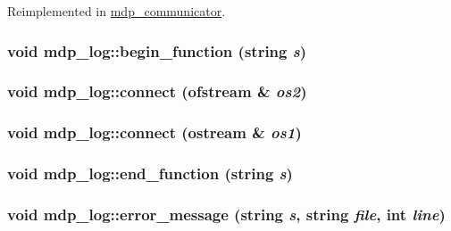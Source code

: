 Reimplemented in \hyperlink{classmdp__communicator_aa601b7788f242a7f71b955a6bdf7e002}{mdp\_\-communicator}.\hypertarget{classmdp__log_a7fac0134af18caa8311bbf3118b82df1}{
\subsubsection[{begin\_\-function}]{\setlength{\rightskip}{0pt plus 5cm}void mdp\_\-log::begin\_\-function (string {\em s})}}
\label{classmdp__log_a7fac0134af18caa8311bbf3118b82df1}
\hypertarget{classmdp__log_a9f9fbc3647e989231c4016179c2932d3}{
\subsubsection[{connect}]{\setlength{\rightskip}{0pt plus 5cm}void mdp\_\-log::connect (ofstream \& {\em os2})}}
\label{classmdp__log_a9f9fbc3647e989231c4016179c2932d3}
\hypertarget{classmdp__log_a8e468b9b08d5008bbf87207a0184c809}{
\subsubsection[{connect}]{\setlength{\rightskip}{0pt plus 5cm}void mdp\_\-log::connect (ostream \& {\em os1})}}
\label{classmdp__log_a8e468b9b08d5008bbf87207a0184c809}
\hypertarget{classmdp__log_aeb82bba50423232fe8ad3a37ed65799d}{
\subsubsection[{end\_\-function}]{\setlength{\rightskip}{0pt plus 5cm}void mdp\_\-log::end\_\-function (string {\em s})}}
\label{classmdp__log_aeb82bba50423232fe8ad3a37ed65799d}
\hypertarget{classmdp__log_a675c488f1e494a9bd3a7466b300ec09a}{
\subsubsection[{error\_\-message}]{\setlength{\rightskip}{0pt plus 5cm}void mdp\_\-log::error\_\-message (string {\em s}, \/  string {\em file}, \/  int {\em line})}}

